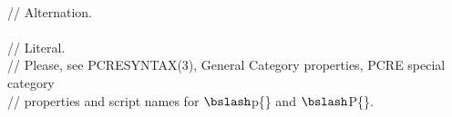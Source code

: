 \begin{bigbigpre}
 \\
// Alternation. \\
 \\
// Literal. \\
// Please, see PCRESYNTAX(3), General Category properties, PCRE special category \\
// properties and script names for \(\bslash\)p\{\} and \(\bslash\)P\{\}. \\

\end{bigbigpre}
